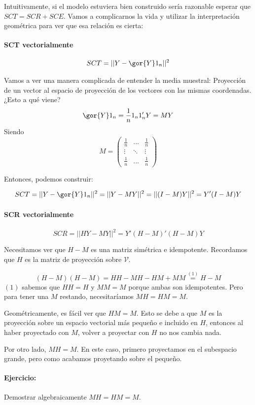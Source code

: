 Intuitivamente, si el modelo estuviera bien construido sería razonable esperar que $SCT = SCR + SCE$.
Vamos a complicarnos la vida y utilizar la interpretación geométrica para ver que esa relación es cierta:


\paragraph{SCT vectorialmente}

\[
SCT = ||Y - \gor{Y}1_n||^2
\]

Vamos a ver una manera complicada de entender la media muestral: Proyección de un vector al espacio de proyección de los vectores con las mismas coordenadas. ¿Esto a qué viene?
\[
\gor{Y}1_n = \frac{1}{n}1_n1'_nY = MY
\]
Siendo \[M = \begin{pmatrix}\frac{1}{n} & ... & \frac{1}{n} \\ \vdots & \ddots & \vdots \\ \frac{1}{n} & ... & \frac{1}{n}\end{pmatrix}\]

Entonces, podemos construir:

\[
SCT = ||Y - \gor{Y}1_n||^2  = || Y-MY||^2 = ||(I-M) Y||^2 = Y'(I-M)Y
\]

\paragraph{SCR vectorialmente}
\[
SCR = || HY-MY||^2 = Y'(H-M)'(H-M)Y
\]

Necesitamos ver que $H-M$ es una matriz simétrica e idempotente. Recordamos que $H$ es la matriz de proyección sobre $\mathcal{V}$.

\[
(H-M)(H-M) = HH - MH - HM + MM \overset{(1)}{=} H - M
\]
$(1)$ sabemos que $HH = H$ y $MM=M$ porque ambas son idempotentes. Pero para tener una $M$ restando, necesitaríamos $MH = HM = M$.

Geométricamente, es fácil ver que $HM=M$. Esto se debe a que $M$ es la proyección sobre un espacio vectorial más pequeño e incluido en $H$, entonces al haber proyectado con $M$, volver a proyectar con $H$ no nos cambia nada.

Por otro lado, $MH = M$. En este caso, primero proyectamos en el subespacio grande, pero como acabamos proyetando sobre el pequeño.

\paragraph{Ejercicio: } Demostrar algebraicamente $MH=HM=M$.

